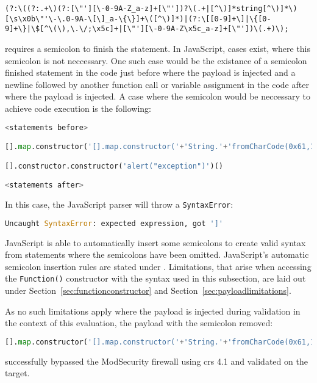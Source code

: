 \begin{lstlisting}[style=basicStyle]
(?:\((?:.+\)(?:[\"'][\-0-9A-Z_a-z]+[\"'])?\(.+|[^\)]*string[^\)]*\)[\s\x0b\"'\-\.0-9A-\[\]_a-\{\}]+\([^\)]*)|(?:\[[0-9]+\]|\{[0-9]+\}|\$[^\(\),\.\/;\x5c]+|[\"'][\-0-9A-Z\x5c_a-z]+[\"'])\(.+)\);
\end{lstlisting}
requires a semicolon to finish the statement. In JavaScript, cases exist, where this semicolon is not neccessary. One such case would be the existance of a semicolon finished statement in the code just before where the payload is injected and a newline followed by another function call or variable assignment in the code after where the payload is injected. A case where the semicolon would be neccessary to achieve code execution is the following:

\begin{lstlisting}[style=basicStyle, language=Python]
<statements before>

[].map.constructor('[].map.constructor('+'String.'+'fromCharCode(0x61,108,0x65,114,116,0x28,96,120,115,115,0x60,0x29)'+')();')()

[].constructor.constructor('alert("exception")')()

<statements after>
\end{lstlisting}
In this case, the JavaScript parser will throw a \verb|SyntaxError|:

\begin{lstlisting}[style=basicStyle, language=Python]
Uncaught SyntaxError: expected expression, got ']'
\end{lstlisting}
JavaScript is able to automatically insert some semicolons to create valid syntax from statements where the semicolons have been omitted. JavaScript's automatic semicolon insertion rules are stated under \cite{js/autosemi}. Limitations, that arise when accessing the \verb|Function()| constructor with the syntax used in this subsection, are laid out under Section~\ref{sec:functionconstructor} and Section~\ref{sec:payloadlimitations}.

As no such limitations apply where the payload is injected during validation in the context of this evaluation, the payload with the semicolon removed:

\begin{lstlisting}[style=basicStyle, language=Python, caption=fromCharCode() bypass]
[].map.constructor('[].map.constructor('+'String.'+'fromCharCode(0x61,108,0x65,114,116,0x28,96,120,115,115,0x60,0x29)'+')();')();
\end{lstlisting}
successfully bypassed the ModSecurity firewall using \acrshort{crs} 4.1 and validated on the target.


